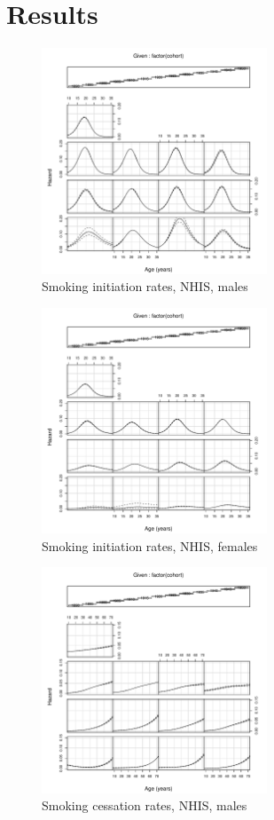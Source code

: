 \documentclass[11pt,a4paper]{article}
\begin{document}
\section{Results}

\begin{figure}[ht]
  \centering
  \includegraphics[width=0.6\textwidth]{coplot-1.pdf}    
  \caption{Smoking initiation rates, NHIS, males}
  \label{fig:init-males}
\end{figure}
\begin{figure}[ht]
  \centering
  \includegraphics[width=0.6\textwidth]{coplot-2.pdf}    
  \caption{Smoking initiation rates, NHIS, females}
  \label{fig:init-females}
\end{figure}
\begin{figure}[ht]
  \centering
  \includegraphics[width=0.6\textwidth]{coplot-3.pdf}    
  \caption{Smoking cessation rates, NHIS, males}
  \label{fig:cess-males}
\end{figure}
\end{document}
